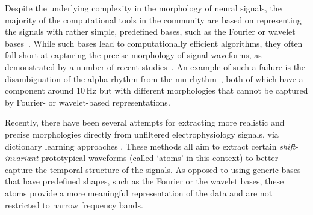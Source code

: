 Despite the underlying complexity in the morphology of neural signals, the majority of the computational tools in the community are based on representing the signals with rather simple, predefined bases, such as the Fourier or wavelet bases~\citep{cohen2014analyzing}.
While such bases lead to computationally efficient algorithms, they often fall short at capturing the precise morphology of signal waveforms, as demonstrated by a number of recent studies~\citep{jones2016brain,mazaheri2008asymmetric}. An example of such a failure is the disambiguation of the alpha rhythm from the mu rhythm~\citep{hari2017meg}, both of which have a component around $10$\,Hz but with different morphologies that cannot be captured by Fourier- or wavelet-based representations.






Recently, there have been several attempts for extracting more realistic and precise morphologies directly from unfiltered electrophysiology signals, via dictionary learning approaches \citep{jost2006motif,brockmeier2016learning,hitziger2017adaptive,gips2017discovering}.
%
These methods all aim to extract certain \emph{shift-invariant} prototypical waveforms (called `atoms' in this context) to better capture the temporal structure of the signals.
%
As opposed to using generic bases that have predefined shapes, such as the Fourier or the wavelet bases, these atoms provide a more meaningful representation of the data and are not restricted to narrow frequency bands.

